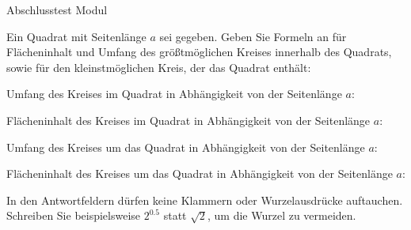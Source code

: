 \begin{MTest}{Abschlusstest Modul }
\begin{MExercise}
Ein Quadrat mit Seitenl\"ange $a$ sei gegeben. Geben Sie Formeln an f\"ur 
Fl\"acheninhalt und Umfang des gr\"o\ss tm\"oglichen Kreises innerhalb des 
Quadrats, sowie f\"ur den kleinstm\"oglichen Kreis, der das Quadrat enth\"alt:
\begin{MExerciseItems}
\item{Umfang des Kreises im Quadrat in Abh\"angigkeit von der Seitenl\"ange $a$: }
%
\item{Fl\"acheninhalt des Kreises im Quadrat in Abh\"angigkeit von der Seitenl\"ange $a$: }
%
\item{Umfang des Kreises um das Quadrat in Abh\"angigkeit von der Seitenl\"ange $a$: }
%
\item{Fl\"acheninhalt des Kreises um das Quadrat in Abh\"angigkeit von der Seitenl\"ange $a$: }
\end{MExerciseItems}
\par
In den Antwortfeldern d\"urfen keine Klammern oder Wurzelausdr\"ucke auftauchen.
Schreiben Sie beispielsweise $2^{0.5}$ statt $\sqrt{2}$, um die Wurzel zu 
vermeiden.
\end{MExercise}

\end{MTest}



